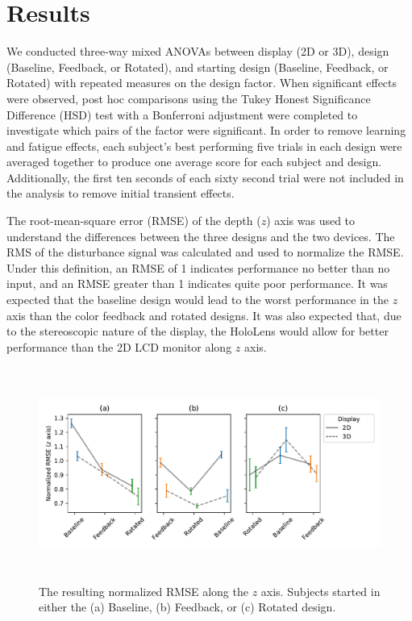 \section{Results}
We conducted three-way mixed ANOVAs between display (2D or 3D), design (Baseline, Feedback, or Rotated), and starting design (Baseline, Feedback, or Rotated) with repeated measures on the design factor.
When significant effects were observed, post hoc comparisons using the Tukey Honest Significance Difference (HSD) test with a Bonferroni adjustment were completed to investigate which pairs of the factor were significant.
In order to remove learning and fatigue effects, each subject's best performing five trials in each design were averaged together to produce one average score for each subject and design.
Additionally, the first ten seconds of each sixty second trial were not included in the analysis to remove initial transient effects.

The root-mean-square error (RMSE) of the depth ($z$) axis was used to understand the differences between the three designs and the two devices.
The RMS of the disturbance signal was calculated and used to normalize the RMSE.
Under this definition, an RMSE of 1 indicates performance no better than no input, and an RMSE greater than 1 indicates quite poor performance.
It was expected that the baseline design would lead to the worst performance in the $z$ axis than the color feedback and rotated designs.
It was also expected that, due to the stereoscopic nature of the display, the HoloLens would allow for better performance than the 2D LCD monitor along $z$ axis.

\begin{figure}[tb!]
    \begin{center}
        \includegraphics[height=7cm]{figures/AR/x_design_y_zrmse_col_startdesign_hue_device.png}
        \caption[The resulting normalized RMSE along the $z$ axis]{The resulting normalized RMSE along the $z$ axis. Subjects started in either the (a) Baseline, (b) Feedback, or (c) Rotated design.}
        \label{fig:zrmseanovas}
    \end{center}
\end{figure}

